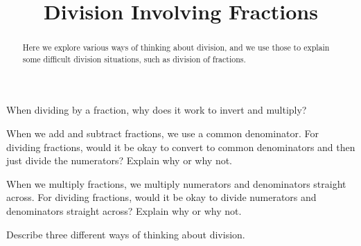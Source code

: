 \documentclass[handout]{ximera}
\title{Division Involving Fractions}
\begin{document}
\begin{abstract}
Here we explore various ways of thinking about division, and we use those to explain some difficult division situations, such as division of fractions.
\end{abstract}
\maketitle


\begin{problem}
When dividing by a fraction, why does it work to invert and multiply?
\begin{freeResponse}
\end{freeResponse}
\end{problem}
\vspace{2in}

\begin{problem}
When we add and subtract fractions, we use a common denominator.  For dividing fractions, would it be okay to convert to common denominators and then just divide the numerators?  Explain why or why not. 
\begin{freeResponse}
\end{freeResponse}
\end{problem}

\newpage 

\begin{problem}
When we multiply fractions, we multiply numerators and denominators straight across.  For dividing fractions, would it be okay to divide numerators and denominators straight across?  Explain why or why not. 
\begin{freeResponse}
\end{freeResponse}
\end{problem}

\vspace{2in}

\begin{problem}
Describe three different ways of thinking about division.
\begin{freeResponse}
\end{freeResponse}

\end{problem}

\end{document}
